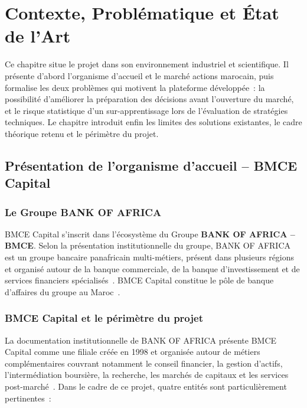 \chapter{Contexte, Problématique et État de l'Art}
\label{ch:contexte}

Ce chapitre situe le projet dans son environnement industriel et scientifique. Il
présente d'abord l'organisme d'accueil et le marché actions marocain, puis formalise
les deux problèmes qui motivent la plateforme développée~: la possibilité d'améliorer
la préparation des décisions avant l'ouverture du marché, et le risque statistique
d'un sur-apprentissage lors de l'évaluation de stratégies techniques. Le chapitre introduit
enfin les limites des solutions existantes, le cadre théorique retenu et le périmètre
du projet.

\section{Présentation de l'organisme d'accueil -- BMCE Capital}
\label{sec:bmce}

\subsection{Le Groupe BANK OF AFRICA}

BMCE Capital s'inscrit dans l'écosystème du Groupe \textbf{BANK OF AFRICA -- BMCE}.
Selon la présentation institutionnelle du groupe, BANK OF AFRICA est un groupe
bancaire panafricain multi-métiers, présent dans plusieurs régions et organisé autour
de la banque commerciale, de la banque d'investissement et de services financiers
spécialisés~\cite{bankofafrica_profile}. BMCE Capital constitue le pôle de banque
d'affaires du groupe au Maroc~\cite{bankofafrica_bmcecapital}.

\subsection{BMCE Capital et le périmètre du projet}

La documentation institutionnelle de BANK OF AFRICA présente BMCE Capital comme une
filiale créée en 1998 et organisée autour de métiers complémentaires couvrant notamment
le conseil financier, la gestion d'actifs, l'intermédiation boursière, la recherche,
les marchés de capitaux et les services post-marché~\cite{bankofafrica_bmcecapital}.
Dans le cadre de ce projet, quatre entités sont particulièrement pertinentes~:

